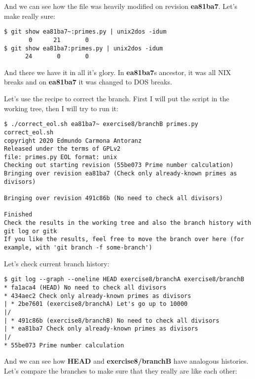 And we can see how the file was heavily modified on revision {\bf ea81ba7}. Let's make really sure:

\begin{lstlisting}[style=console_style,
	basicstyle=\small,
	caption={\bf exercise 8} - double checking]
$ git show ea81ba7~:primes.py | unix2dos -idum
       0      21       0
$ git show ea81ba7:primes.py | unix2dos -idum
      24       0       0
\end{lstlisting}

And there we have it in all it's glory. In {\bf ea81ba7}s ancestor, it was all NIX breaks and on {\bf ea81ba7} it was changed to DOS breaks.

Let's use the recipe to correct the branch. First I will put the script in the working tree, then I will try to run it:

\begin{lstlisting}[style=console_style,
	basicstyle=\small,
	caption={\bf exercise 8} - running recipe script]
$ ./correct_eol.sh ea81ba7~ exercise8/branchB primes.py
correct_eol.sh
copyright 2020 Edmundo Carmona Antoranz
Released under the terms of GPLv2
file: primes.py EOL format: unix
Checking out starting revision (55be073 Prime number calculation)
Bringing over revision ea81ba7 (Check only already-known primes as divisors)

Bringing over revision 491c86b (No need to check all divisors)

Finished
Check the results in the working tree and also the branch history with git log or gitk
If you like the results, feel free to move the branch over here (for example, with 'git branch -f some-branch')
\end{lstlisting}

Let's check current branch history:

\begin{lstlisting}[style=console_style,
	basicstyle=\small,
	caption={\bf exercise 8} - running recipe script]
$ git log --graph --oneline HEAD exercise8/branchA exercise8/branchB
* fa1aca4 (HEAD) No need to check all divisors
* 434aec2 Check only already-known primes as divisors
| * 2be7601 (exercise8/branchA) Let's go up to 10000
|/  
| * 491c86b (exercise8/branchB) No need to check all divisors
| * ea81ba7 Check only already-known primes as divisors
|/  
* 55be073 Prime number calculation
\end{lstlisting}

And we can see how {\bf HEAD} and {\bf exercise8/branchB} have analogous histories. Let's compare the branches to
make sure that they really are like each other:

